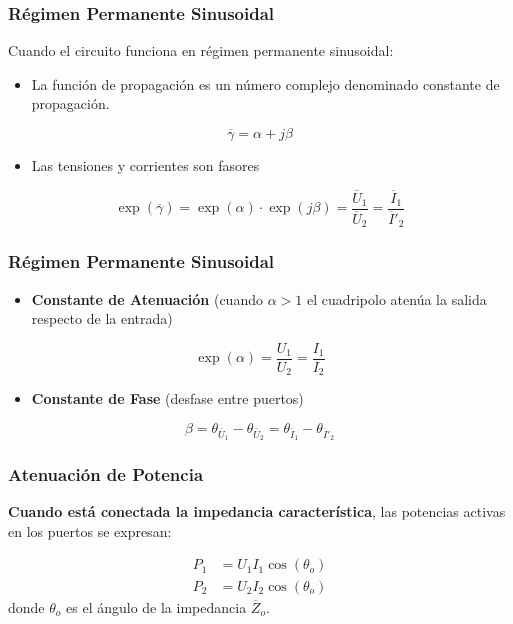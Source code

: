 \subsubsection{Régimen Permanente Sinusoidal}
\label{sec:orgde43a7b}

Cuando el circuito funciona en régimen permanente sinusoidal:

\begin{itemize}
\item La función de propagación es un número complejo denominado constante de propagación.
\end{itemize}
\[
  \overline{\gamma} = \alpha + j\beta
\]
\begin{itemize}
\item Las tensiones y corrientes son fasores
\end{itemize}
\[
  \exp(\overline{\gamma}) = \exp(\alpha) \cdot \exp(j\beta) = \frac{\overline{U}_1}{\overline{U}_2} = \frac{\overline{I}_1}{\overline{I}'_2}
\]

\subsubsection{Régimen Permanente Sinusoidal}
\label{sec:org6afeb0f}
\begin{itemize}
\item \textbf{Constante de Atenuación} (cuando \(\alpha > 1\) el cuadripolo atenúa la salida respecto de la entrada)
\end{itemize}
\[
  \exp(\alpha) = \frac{U_1}{U_2} = \frac{I_1}{I_2}
\]
\begin{itemize}
\item \textbf{Constante de Fase} (desfase entre puertos)
\end{itemize}
\[
  \beta = \theta_{\overline{U}_1} - \theta_{\overline{U}_2} = \theta_{\overline{I}_1} - \theta_{\overline{I}'_2}
\]

\subsubsection{Atenuación de Potencia}
\label{sec:org3c1bb07}

\textbf{Cuando está conectada la impedancia característica}, las potencias activas en los puertos se expresan:

\begin{align*}
  P_1 &= U_1 I_1 \cos(\theta_o)\\
  P_2 &= U_2 I_2 \cos(\theta_o)
\end{align*}
donde \(\theta_o\) es el ángulo de la impedancia \(\overline{Z}_o\).

